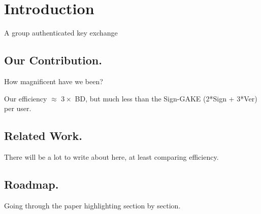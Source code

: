 \newcommand{\introGAKE}{\text{GAKE}\xspace}
\newcommand{\introAKE}{\text{AKE}\xspace}


\section{Introduction}\label{sec:introduction}
A group authenticated key exchange %

\subsection{Our Contribution.}
How magnificent have we been?

Our efficiency $\approx$ $3\times $ BD, but much less than the Sign-GAKE (2*Sign + 3*Ver) per user.

\subsection{Related Work.}
There will be a lot to write about here, at least comparing efficiency.

\subsection{Roadmap.}
Going through the paper highlighting section by section.
